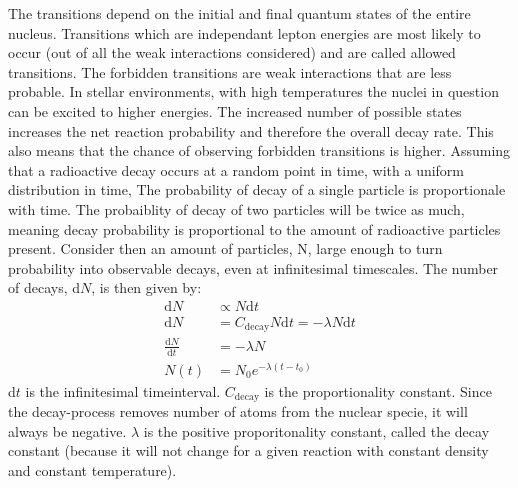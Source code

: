The \betadecay transitions depend on the initial and final quantum states of the entire nucleus.
Transitions which are independant lepton energies are most likely to occur (out of all the weak interactions considered)
and are called allowed transitions.
The forbidden transitions are weak interactions that are less probable.
In stellar environments, with high temperatures the nuclei in question can be excited to higher energies.
The increased number of possible states increases the net reaction probability and therefore the overall decay rate.
This also means that the chance of observing forbidden transitions is higher.
Assuming that a radioactive decay occurs at a random point in time, with a uniform distribution in time,
The probability of decay of a single particle is proportionale with time.
The probaiblity of decay of two particles will be twice as much, meaning decay probability is
proportional to the amount of radioactive particles present.
Consider then an amount of particles, N,  large enough to turn probability into observable decays,
even at infinitesimal timescales. The number of decays, d$N$, is then given by:
\begin{equation}
  \begin{array}{rl}
    \textrm{d}N &\propto N \textrm{d}t \\
    \textrm{d}N &= C_{\textrm{decay}} N \textrm{d}t = -\lambda N \textrm{d}t\\
    \frac{\textrm{d}N}{\textrm{d}t} &= -\lambda N \\
    N(t) &= N_0 e^{-\lambda (t - t_0)}
  \end{array}
  \label{eq:decay-diff-eq}
\end{equation}
d$t$ is the infinitesimal timeinterval.
$C_{\textrm{decay}}$ is the proportionality constant.
Since the decay-process removes number of atoms from the nuclear specie, it will always be negative.
$\lambda$ is the positive proporitonality constant, called the decay constant (because it will not change for a given reaction with constant density and constant temperature).

